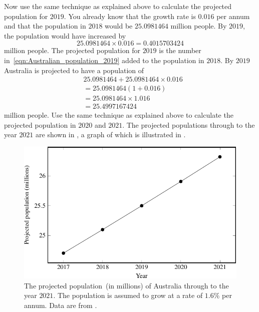\documentclass[a4paper,oneside,12pt]{article}
\begin{document}
\begin{solution}
Now use the same technique as explained above to calculate the
projected population for $2019$.  You already know that the growth
rate is $0.016$ per annum and that the population in $2018$ would be
$25.0981464$ million people.  By $2019$, the population would have
increased by
\begin{equation}
\label{eqn:Australian_population_2019}
25.0981464 \times 0.016
=
0.4015703424
\end{equation}
million people.  The projected population for $2019$ is the number
in~\eqref{eqn:Australian_population_2019} added to the population in
$2018$.  By $2019$ Australia is projected to have a population of
\begin{align*}
&25.0981464 + 25.0981464 \times 0.016 \\[4pt]
&=
25.0981464 (1 + 0.016) \\[4pt]
&=
25.0981464 \times 1.016 \\[4pt]
&=
25.4997167424
\end{align*}
million people.  Use the same technique as explained above to
calculate the projected population in $2020$ and $2021$.  The
projected populations through to the year $2021$ are shown in
, a graph of which is
illustrated in .
\end{solution}

\begin{table}[!htbp]
\centering

\caption{%
  The projected population of Australia through to the year $2021$.
  The population numbers are in terms of millions.  For example, the
  population in $2017$ was estimated to be $24.7029$ million people.
  The population is assumed to grow at a rate of $1.6\%$ per annum.
}
\label{tab:Australian_population_2017}
\end{table}

\begin{figure}[!htbp]
\centering
\includegraphics[scale=1.1]{image/11/australian-population.pdf}
\caption{%
  The projected population~(in millions) of Australia through to the
  year $2021$.  The population is assumed to grow at a rate of $1.6\%$
  per annum.  Data are from .
}
\label{fig:Australian_population_2017}
\end{figure}
\end{document}
